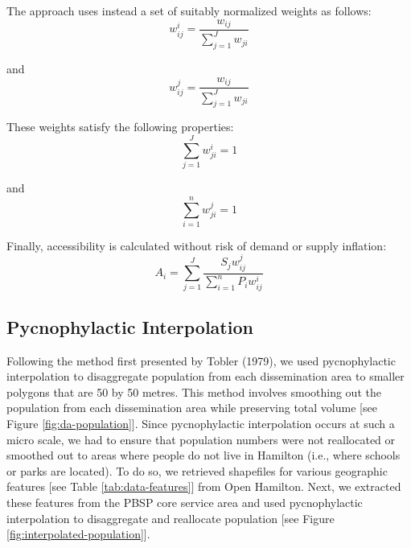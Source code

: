 \documentclass[]{elsarticle} %
\begin{document}
The approach uses instead a set of suitably normalized weights as
follows: \[
{w_{ij}^{i} = \frac {w_{ij}}{\sum_{j = 1}^{J} {w_{ji}}}}
\]

and \[
{w_{ij}^{j} = \frac {w_{ij}}{\sum_{j = 1}^{J} {w_{ji}}}}
\]

These weights satisfy the following properties: \[
\sum_{j = 1}^{J} {w^i_{ji}} = 1
\]

and \[
\sum_{i = 1}^{n} {w^j_{ji}} = 1
\]

Finally, accessibility is calculated without risk of demand or supply
inflation: \[
A_i = {\sum_{j = 1}^{J} \frac {S_j{w^j_{ij}}}{\sum_{i = 1}^{n} P_i{w^i_{ij}}}}
\]

\hypertarget{pycnophylactic-interpolation}{%
\subsection{Pycnophylactic
Interpolation}\label{pycnophylactic-interpolation}}

Following the method first presented by Tobler (1979), we used
pycnophylactic interpolation to disaggregate population from each
dissemination area to smaller polygons that are 50 by 50 metres. This
method involves smoothing out the population from each dissemination
area while preserving total volume {[}see Figure
\ref{fig:da-population}{]}. Since pycnophylactic interpolation occurs at
such a micro scale, we had to ensure that population numbers were not
reallocated or smoothed out to areas where people do not live in
Hamilton (i.e., where schools or parks are located). To do so, we
retrieved shapefiles for various geographic features {[}see Table
\ref{tab:data-features}{]} from Open Hamilton. Next, we extracted these
features from the PBSP core service area and used pycnophylactic
interpolation to disaggregate and reallocate population {[}see Figure
\ref{fig:interpolated-population}{]}.
\end{document}
